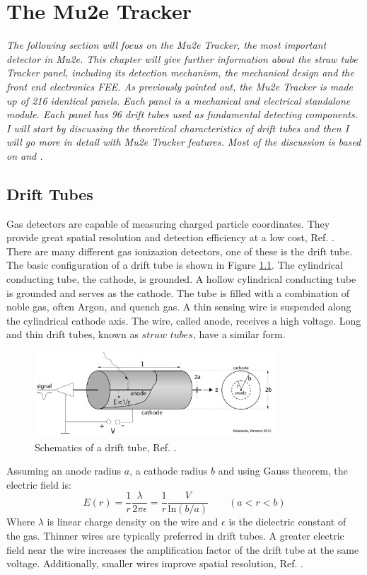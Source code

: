 \chapter{The Mu2e Tracker}\label{chaptertrk}

\textit{The following section will focus on the Mu2e Tracker, the most important detector in Mu2e. 
This chapter will give further information about the straw tube Tracker panel, 
including its detection mechanism, the mechanical design and the front end electronics FEE.
As previously pointed out, the Mu2e Tracker is made up of 216 identical panels. 
Each panel is a mechanical and electrical standalone module. Each panel has 96 drift 
tubes used as fundamental detecting components. I will start by discussing the 
theoretical characteristics of drift tubes and then I will go more in detail with Mu2e Tracker features. 
Most of the discussion is based on \cite{kola} and \cite{bobbb}.}

\section{Drift Tubes}
Gas detectors are capable of measuring charged particle coordinates. 
They provide great spatial resolution and detection efficiency at a low cost, Ref. \cite{kola}. 
There are many different gas ionizazion detectors, one of these is the drift tube.
The basic configuration of a drift tube is shown in Figure \ref{fig:drifttube}.
The cylindrical conducting tube, the cathode, is grounded.
A hollow cylindrical conducting tube is grounded and serves as the cathode.
The tube is filled with a combination of noble gas, often Argon, and quench gas. 
A thin sensing wire is suspended along the cylindrical cathode axis. 
The wire, called anode, receives a high voltage. Long and thin drift tubes, known as $straw$ $tubes$, have a similar form.
\begin{figure}[!h]
    \centering
    \includegraphics[width =0.8\textwidth]{figures/png/Screenshot_20240324_232621.png}
    \caption{Schematics of a drift tube, Ref. \cite{kola}.}
    \label{fig:drifttube}
    \end{figure}
Assuming an anode radius $a$, a cathode radius $b$ and using Gauss theorem, the electric field is:
\begin{equation}\label{avalanche}
    E(r)=\frac{1}{r}\frac{\lambda}{2\pi \epsilon}=\frac{1}{r}\frac{V}{ \text{ln}(b/a)} \qquad (a<r<b)
\end{equation}
Where $\lambda$ is linear charge density on the wire and $\epsilon$ is the dielectric constant of the gas.
Thinner wires are typically preferred in drift tubes. A greater electric field near the wire increases the amplification factor 
of the drift tube at the same voltage. Additionally, smaller wires improve spatial resolution, Ref. \cite{kola}. 
